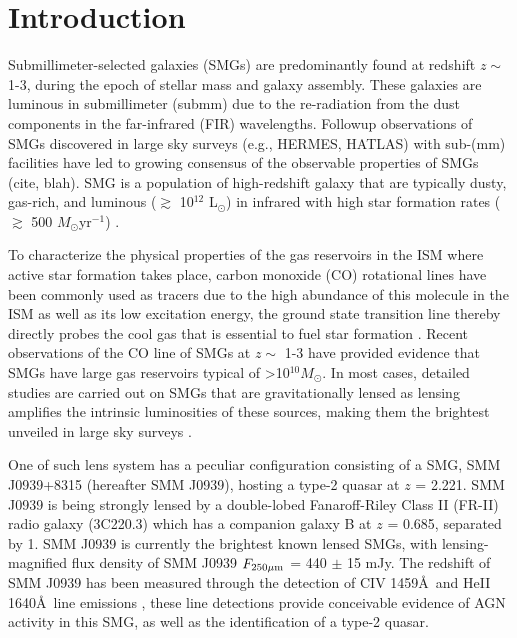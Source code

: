 \documentclass[twocolumn,apj,numberedappendix]{emulateapj}
\newcommand{\Msun}{\mbox{$M_{\odot}$}}
\newcommand{\Lsun}{\mbox{L$_{\odot}$}}
\newcommand{\eg}{{\sl e.g.,~}}
\newcommand{\pmOne}{$^{-1}$}
\begin{document}
\section{Introduction}\label{sec:intro}
Submillimeter-selected galaxies (SMGs) are predominantly found at redshift $z \sim$ 1-3, during the epoch of stellar mass and 
galaxy assembly. These galaxies are luminous in submillimeter (submm) due to the re-radiation from the dust components in the
 far-infrared (FIR) wavelengths. Followup observations of SMGs discovered in large sky surveys (e.g., HERMES, HATLAS) with sub-(mm) facilities have led to growing consensus
  of the observable properties of SMGs (cite, blah). SMG is a population of high-redshift galaxy that are typically dusty, gas-rich, 
  and luminous ($\gtrsim$ 10$^{12}$ \Lsun) in infrared with high star formation rates ($\gtrsim $ 500 \Msun yr\pmOne) \citep[\eg][]{Lagache05a}.
  
  To characterize the physical properties of the gas reservoirs in the ISM where active star formation takes place, carbon monoxide (CO) rotational lines have been commonly used as tracers due to the high abundance of this molecule in the ISM as well as its low excitation energy, the ground state transition line thereby directly probes the cool gas that is essential to fuel star formation \citep{Carilli13a}. Recent observations of the CO line of SMGs at $z \sim$ 1-3 have  
provided evidence that SMGs have large gas reservoirs typical of \textgreater 10$^{10}$\Msun. In most cases, detailed studies are carried out on SMGs that are gravitationally lensed as lensing amplifies the intrinsic luminosities of these sources, making them the brightest unveiled in large sky surveys \citep{Negrello10a,Vieira10a}. \par
One of such lens system has a peculiar configuration consisting of a SMG, SMM J0939+8315 (hereafter SMM J0939), hosting a 
type-2 quasar at $z$ = 2.221. SMM J0939 is being strongly lensed by a double-lobed Fanaroff-Riley Class II (FR-II) \citep*{Fanaroff74} radio galaxy (3C220.3) which has a 
companion galaxy B at $z$ = 0.685, separated by 1. SMM J0939 is currently
the brightest known lensed
SMGs, with lensing-magnified flux density of SMM J0939 $F_{\rm 250\mu m}$ = 440 $\pm$ 15 mJy. The redshift of SMM J0939 has 
been measured through the detection of CIV 1459\AA\
 and HeII 1640\AA\
line emissions \citep[hereafter H14]{Haas14}, these line detections provide conceivable evidence of AGN activity in this SMG, as well as the identification of a type-2 quasar. 
\end{document}
